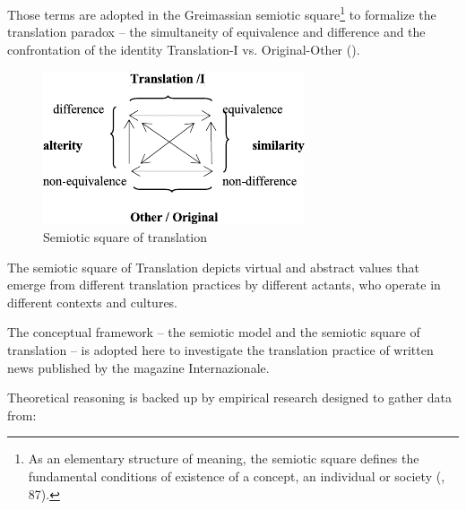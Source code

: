 \documentclass[output=paper]{LSP/langsci}
\begin{document}
Those terms are adopted in the Greimassian semiotic square\footnote{As an elementary structure of meaning, the semiotic square defines the fundamental conditions of existence of a concept, an individual or society (\citealt{GreimasRastier1968}, 87).} to formalize the translation paradox -- the simultaneity of equivalence and difference and the confrontation of the identity Translation-I vs. Original-Other ().

% 
% 
% 
% 
% 

\begin{figure}
\includegraphics[width=.5\textwidth]{figures/troqe-marchan/figure2.pdf}
\caption{Semiotic square of translation} 
\label{troqe-marchan:fig:2}
\end{figure}

The semiotic square of Translation depicts virtual and abstract values that emerge from different translation practices by different actants, who operate in different contexts and cultures. 
\newpage 

The conceptual framework -- the semiotic model and the semiotic square of translation -- is adopted here to investigate the translation practice of written news published by the  magazine Internazionale. 

Theoretical reasoning is backed up by empirical research designed to gather data from: 
\end{document}
